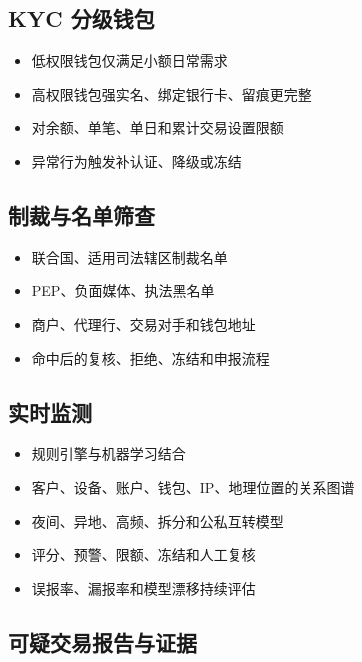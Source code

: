 \subsection{KYC 分级钱包}\label{kyc-ux5206ux7ea7ux94b1ux5305}

\begin{itemize}
\tightlist
\item
  低权限钱包仅满足小额日常需求
\item
  高权限钱包强实名、绑定银行卡、留痕更完整
\item
  对余额、单笔、单日和累计交易设置限额
\item
  异常行为触发补认证、降级或冻结
\end{itemize}

\subsection{制裁与名单筛查}\label{ux5236ux88c1ux4e0eux540dux5355ux7b5bux67e5}

\begin{itemize}
\tightlist
\item
  联合国、适用司法辖区制裁名单
\item
  PEP、负面媒体、执法黑名单
\item
  商户、代理行、交易对手和钱包地址
\item
  命中后的复核、拒绝、冻结和申报流程
\end{itemize}

\subsection{实时监测}\label{ux5b9eux65f6ux76d1ux6d4b}

\begin{itemize}
\tightlist
\item
  规则引擎与机器学习结合
\item
  客户、设备、账户、钱包、IP、地理位置的关系图谱
\item
  夜间、异地、高频、拆分和公私互转模型
\item
  评分、预警、限额、冻结和人工复核
\item
  误报率、漏报率和模型漂移持续评估
\end{itemize}

\subsection{可疑交易报告与证据}\label{ux53efux7591ux4ea4ux6613ux62a5ux544aux4e0eux8bc1ux636e}

